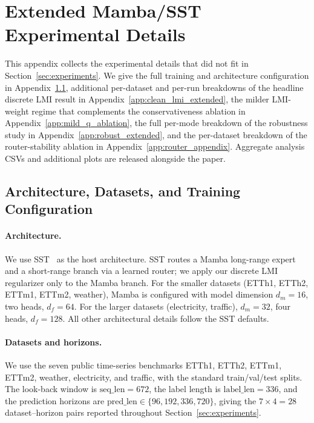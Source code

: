 \documentclass[10pt]{article} %
\theoremstyle{definition}
\begin{document}
\section{Extended Mamba/SST Experimental Details}
\label{app:extended_experiments}

This appendix collects the experimental details that did not fit in Section~\ref{sec:experiments}. We give the full training and architecture configuration in Appendix~\ref{app:experimental_setup}, additional per-dataset and per-run breakdowns of the headline discrete LMI result in Appendix~\ref{app:clean_lmi_extended}, the milder LMI-weight regime that complements the conservativeness ablation in Appendix~\ref{app:mild_q_ablation}, the full per-mode breakdown of the robustness study in Appendix~\ref{app:robust_extended}, and the per-dataset breakdown of the router-stability ablation in Appendix~\ref{app:router_appendix}. Aggregate analysis CSVs and additional plots are released alongside the paper.

\subsection{Architecture, Datasets, and Training Configuration}
\label{app:experimental_setup}

\paragraph{Architecture.}
We use SST~\citep{XiongxiaoXuSST} as the host architecture. SST routes a Mamba long-range expert and a short-range branch via a learned router; we apply our discrete LMI regularizer only to the Mamba branch. For the smaller datasets (ETTh1, ETTh2, ETTm1, ETTm2, weather), Mamba is configured with model dimension $d_m=16$, two heads, $d_f=64$. For the larger datasets (electricity, traffic), $d_m=32$, four heads, $d_f=128$. All other architectural details follow the SST defaults.

\paragraph{Datasets and horizons.}
We use the seven public time-series benchmarks ETTh1, ETTh2, ETTm1, ETTm2, weather, electricity, and traffic, with the standard train/val/test splits. The look-back window is $\text{seq\_len}=672$, the label length is $\text{label\_len}=336$, and the prediction horizons are $\text{pred\_len}\in\{96, 192, 336, 720\}$, giving the $7\times 4=28$ dataset--horizon pairs reported throughout Section~\ref{sec:experiments}.
\end{document}
